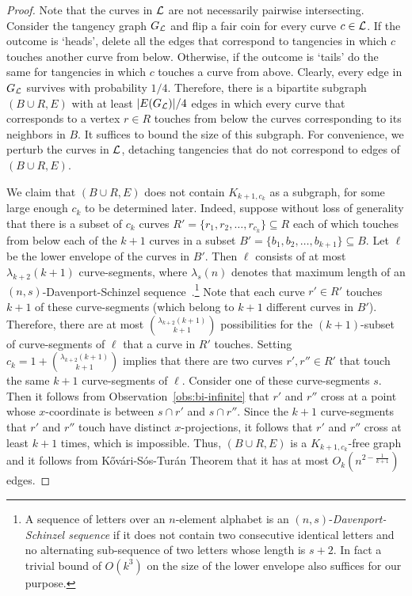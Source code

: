 \documentclass[11pt]{article}
\theoremstyle{definition}
\def\L{{\cal L}}
\begin{document}
\begin{proof}
	Note that the curves in $\L$ are not necessarily pairwise intersecting.
Consider the tangency graph $G_\L$ and flip a fair coin for every curve $c \in \L$. If the outcome is `heads', delete all the edges that correspond to tangencies in which $c$ touches another curve from below.
Otherwise, if the outcome is `tails' do the same for tangencies in which $c$ touches a curve from above.
Clearly, every edge in $G_\L$ survives with probability $1/4$. Therefore, there is a bipartite  subgraph $(B \cup R, E)$ with at least $|E(G_\L)|/4$ edges in which every curve that corresponds to a vertex $r \in R$ touches from below the curves corresponding to its neighbors in $B$.
It suffices to bound the size of this subgraph.
For convenience, we perturb the curves in $\L$, detaching tangencies that do not correspond to edges of $(B \cup R, E)$. 

	We claim that $(B \cup R, E)$ does not contain $K_{k+1,c_k}$ as a subgraph, for some large enough $c_k$ to be determined later.
	Indeed, suppose without loss of generality that there is a subset of $c_k$ curves $R'=\{r_1,r_2,\ldots,r_{c_k}\}\subseteq R$ each of which touches from below each of the $k+1$ curves in a subset $B'=\{b_1,b_2,\ldots,b_{k+1}\}\subseteq B$.
	Let $\ell$ be the lower envelope of the curves in $B'$.
	Then $\ell$ consists of at most $\lambda_{k+2}(k+1)$ curve-segments, where $\lambda_s(n)$ denotes that maximum length of an $(n,s)$-Davenport-Schinzel sequence~\cite{DS}.\footnote{A sequence of letters over an $n$-element alphabet is an $(n,s)$-\emph{Davenport-Schinzel sequence} if it does not contain two consecutive identical letters and no alternating sub-sequence of two letters whose length is $s+2$. In fact a trivial bound of $O(k^3)$ on the size of the lower envelope also suffices for our purpose.}
	Note that each curve $r' \in R'$ touches $k+1$ of these curve-segments (which belong to $k+1$ different curves in $B'$).
	Therefore, there are at most $\binom{\lambda_{k+2}(k+1)}{k+1}$ possibilities for the $(k+1)$-subset of curve-segments of $\ell$ that a curve in $R'$ touches.
	Setting $c_k = 1+ \binom{\lambda_{k+2}(k+1)}{k+1}$
	implies that there are two curves $r',r'' \in R'$ that touch the same $k+1$ curve-segments of $\ell$.
	Consider one of these curve-segments $s$. Then it follows from Observation~\ref{obs:bi-infinite} that $r'$ and $r''$ cross at a point whose $x$-coordinate is between $s \cap r'$ and $s \cap r''$.
	Since the $k+1$ curve-segments that $r'$ and $r''$ touch have distinct $x$-projections, it follows that $r'$ and $r''$ cross at least $k+1$ times, which is impossible.
	Thus, $(B \cup R,E)$ is a $K_{k+1,c_k}$-free graph and it follows from K\H{o}v\'ari-S\'os-Tur\'an Theorem that it has at most $O_k\left(n^{2-\frac{1}{k+1}}\right)$ edges.
\end{proof}
\end{document}
